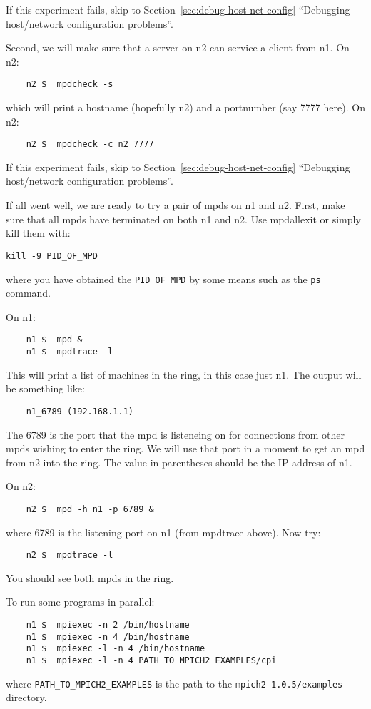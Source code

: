 \documentclass[dvipdfm,11pt]{article}
\begin{document}
\begin{enumerate}
If this experiment fails, skip to Section~\ref{sec:debug-host-net-config}
``Debugging host/network configuration problems''.

Second, we will make sure that a server on n2 can service a client from n1.
On n2:
\begin{verbatim}
    n2 $  mpdcheck -s
\end{verbatim}
which will print a hostname (hopefully n2) and a portnumber (say 7777 here).
On n2:
\begin{verbatim}
    n2 $  mpdcheck -c n2 7777
\end{verbatim}

If this experiment fails, skip to Section~\ref{sec:debug-host-net-config}
``Debugging host/network configuration problems''.

If all went well, we are ready to try a pair of mpds on n1 and n2.
First, make sure that all mpds have terminated on both n1 and n2.  Use
mpdallexit or simply kill them with:
\begin{verbatim}
kill -9 PID_OF_MPD
\end{verbatim}
where you have obtained the \texttt{PID\_OF\_MPD} by some means such as the \texttt{ps} command.

On n1:
\begin{verbatim}
    n1 $  mpd &
    n1 $  mpdtrace -l
\end{verbatim}
This will print a list of machines in the ring, in this case just n1.
The output will be something like:
\begin{verbatim}
    n1_6789 (192.168.1.1)
\end{verbatim}
The 6789 is the port that the mpd is listeneing on for connections from other
mpds wishing to enter the ring.  We will use that port in a moment to get an mpd
from n2 into the ring.  The value in parentheses should be the IP address of n1.

On n2:
\begin{verbatim}
    n2 $  mpd -h n1 -p 6789 &
\end{verbatim}
where 6789 is the listening port on n1 (from mpdtrace above).
Now try:
\begin{verbatim}
    n2 $  mpdtrace -l
\end{verbatim}
You should see both mpds in the ring.

To run some programs in parallel:
\begin{verbatim}
    n1 $  mpiexec -n 2 /bin/hostname
    n1 $  mpiexec -n 4 /bin/hostname
    n1 $  mpiexec -l -n 4 /bin/hostname
    n1 $  mpiexec -l -n 4 PATH_TO_MPICH2_EXAMPLES/cpi
\end{verbatim}
where \texttt{PATH\_TO\_MPICH2\_EXAMPLES} is the path to the
\texttt{mpich2-1.0.5/examples} directory.


\end{enumerate}
\end{document}
